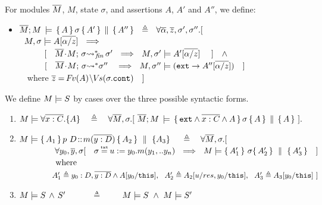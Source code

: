 {
\begin{definition}
For modules $\overline{M}$, $M$, state $\sigma$, and assertions $A$, $A'$ and  $A''$, we define:
\begin{itemize}
\item
$ {\overline{M}; M\, \models \, \{\, A\,\}\, \sigma \, \{\, A'\,\} \,\parallel\, \{\, A''\,\}  } \ \ \triangleq \ \ \forall \overline{\alpha}, \overline{z}, \sigma',\sigma''.[
$  \\
$\strut \hspace{.2cm} M,  \sigma \models  {A[\overline{\alpha/z}]}  %
  \  \ \Longrightarrow$\\
 $\strut   \ \ \ \  \  \ \ \ \   [ \ \ \  { \overline{M}\!\cdot\! M;\, {\sigma} {\rightsquigarrow^*}\!\!_{\mathit{fin}}\, \sigma' }\ \ \Longrightarrow\ \   M,  \sigma' \models  {A'[\overline{\alpha/z}]}  \ \ \ \  ] \ \ \ \wedge$\\
 $\strut   \ \ \ \  \  \ \ \ \   [ \ \  \ {\overline{M}\!\cdot\! M;\, {\sigma} {\rightsquigarrow^*} \sigma'' }\ \  \ \Longrightarrow\   \   M,  \sigma'' \models  {(\mbox{\normalfont{\texttt{ext}}}\rightarrow A''[\overline{\alpha/z}])} \ \ \  ] $\\
 $\strut \hspace{.2cm}$ where  ${{\overline z= {\hspace{-1pt}F\hspace{-1pt}}v(A)\!\setminus\! {\hspace{-1pt}V\hspace{-1pt}}s(\sigma.\mbox{\normalfont{\texttt{cont}}})}}  \ \ \ ]$ %
\end{itemize} 
\end{definition}
}


\begin{definition}  
We define $M \models {S}$ by cases over the three possible syntactic forms.

\label{def:necessity-semantics}

\begin{enumerate}
 \item
 $M \models \forall {\overline {x:C}}.{{\{}}{A}{{\}}} \ \  \ \triangleq   \ \ \ {\forall   \overline{M},  \sigma.[\ {\overline{M}; M\, \models \, \{\, \mbox{\normalfont{\texttt{ext}}} \wedge \overline {x:C} \wedge A\,\}\, \sigma \, \{\, A\,\} \,\parallel\, \{\, A\,\}  }\ ].}$
  \item
 $M \models   \{\, A_1\, \}\, p\ D\!::\!m(\overline{y:D})\, \{\, A_2\, \} \, \,\parallel\,\, \{ A_3 \}\  \ \ \   \triangleq    \ \ \ \forall   \overline{M},  \sigma.[\ $    \\
$\strut  \ \ \   \ \ \ \ \ \ \ \ \   \   { \forall   y_0,\overline y, \sigma[ \ \ \ \sigma\txteq {u:=y_0.m(y_1,..y_n)} \ \ \Longrightarrow \ \ 
\satisfies  {M} {\quadruple  {A_1'} }   {\sigma}   {A_2' } {A_3' }  \  \ \  ]} $  \\
$\strut  \ \ \   \ \ \ \ \ \ \ \ \   \  \mbox{where}$\\
$\strut  \ \ \   \ \ \ \ \ \ \ \ \   \   A_1' \triangleq   y_0:D,{\overline {y:D}}   \wedge   A[y_0/\mbox{\normalfont{\texttt{this}}}],\  \  A_2' \triangleq A_2[u/res,y_0/\mbox{\normalfont{\texttt{this}}}],\ \ A_3' \triangleq A_3[y_0/\mbox{\normalfont{\texttt{this}}}]   \  ]$  
 \item
 $M \models S\, \wedge\, S'$\ \ \  \ \ \  $\triangleq$  \  \ \  \   $M \models S\ \wedge \ M \models S'$
\end{enumerate}
\end{definition}


